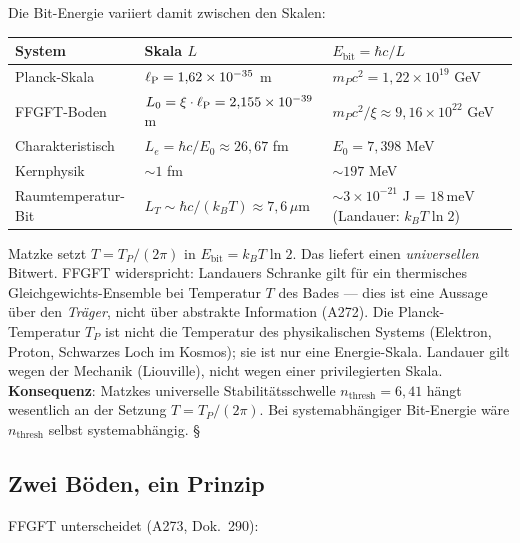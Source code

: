 Die Bit-Energie variiert damit zwischen den Skalen:

\begin{center}
\small
\begin{tabular}{@{}lll@{}}
  \toprule
  System & Skala $L$ & $E_{\mathrm{bit}} = \hbar c/L$ \\
  \midrule
  Planck-Skala & $\ell_{\mathrm{P}} = 1{,}62\times10^{-35}$ m & $m_P c^2 = 1{,}22\times10^{19}$ GeV \\
  FFGFT-Boden & $L_0 = \xi\cdot\ell_{\mathrm{P}} = 2{,}155\times10^{-39}$ m & $m_P c^2/\xi \approx 9{,}16\times10^{22}$ GeV \\
  Charakteristisch & $L_e = \hbar c/E_0 \approx 26{,}67$ fm & $E_0 = 7{,}398$ MeV \\
  Kernphysik & $\sim 1$ fm & $\sim 197$ MeV \\
  Raumtemperatur-Bit & $L_T \sim \hbar c/(k_BT) \approx 7{,}6\,\mu$m & $\sim 3\times10^{-21}$ J = $18\,\mathrm{meV}$ (Landauer: $k_BT\ln 2$) \\
  \bottomrule
\end{tabular}
\end{center}

\begin{tcolorbox}[warnbox, title={FFGFT-Kritik an Matzkes Landauer-Brücke}]
  Matzke setzt $T = T_P/(2\pi)$ in $E_{\mathrm{bit}} = k_BT\ln 2$.
  Das liefert einen \emph{universellen} Bitwert.
  FFGFT widerspricht: Landauers Schranke gilt für ein thermisches Gleichgewichts-Ensemble
  bei Temperatur $T$ des Bades — dies ist eine Aussage über den \emph{Träger},
  nicht über abstrakte Information (A272).
  Die Planck-Temperatur $T_P$ ist nicht die Temperatur des physikalischen Systems
  (Elektron, Proton, Schwarzes Loch im Kosmos); sie ist nur eine Energie-Skala.
  Landauer gilt wegen der Mechanik (Liouville), nicht wegen einer privilegierten Skala.\\[4pt]
  \textbf{Konsequenz}: Matzkes universelle Stabilitätsschwelle
  $n_{\mathrm{thresh}} = 6{,}41$ hängt wesentlich an der Setzung $T = T_P/(2\pi)$.
  Bei systemabhängiger Bit-Energie wäre $n_{\mathrm{thresh}}$ selbst systemabhängig. \S
\end{tcolorbox}

\subsection{Zwei Böden, ein Prinzip}

FFGFT unterscheidet (A273, Dok.\ 290):

